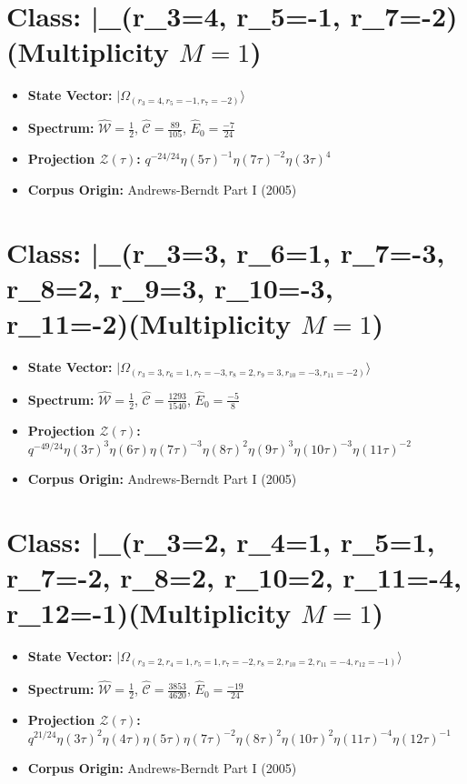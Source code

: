 \documentclass[11pt,twoside,openright]{book}
\begin{document}
\section*{Class: |\Omega_{(r_{3}=4, r_{5}=-1, r_{7}=-2)}\rangle (Multiplicity $M=1$)}
\begin{itemize}
  \item \textbf{State Vector:} $|\Omega_{(r_{3}=4, r_{5}=-1, r_{7}=-2)}\rangle$
  \item \textbf{Spectrum:} $\hat{\mathcal{W}} = \frac{1}{2}$, $\hat{\mathcal{C}} = \frac{89}{105}$, $\hat{E}_0 = \frac{-7}{24}$
  \item \textbf{Projection $\mathcal{Z}(\tau)$:} $q^{-24/24} \eta(5\tau)^{-1} \eta(7\tau)^{-2} \eta(3\tau)^{4}$
  \item \textbf{Corpus Origin:} Andrews-Berndt Part I (2005)
\end{itemize}

\section*{Class: |\Omega_{(r_{3}=3, r_{6}=1, r_{7}=-3, r_{8}=2, r_{9}=3, r_{10}=-3, r_{11}=-2)}\rangle (Multiplicity $M=1$)}
\begin{itemize}
  \item \textbf{State Vector:} $|\Omega_{(r_{3}=3, r_{6}=1, r_{7}=-3, r_{8}=2, r_{9}=3, r_{10}=-3, r_{11}=-2)}\rangle$
  \item \textbf{Spectrum:} $\hat{\mathcal{W}} = \frac{1}{2}$, $\hat{\mathcal{C}} = \frac{1293}{1540}$, $\hat{E}_0 = \frac{-5}{8}$
  \item \textbf{Projection $\mathcal{Z}(\tau)$:} $q^{-49/24} \eta(3\tau)^{3} \eta(6\tau) \eta(7\tau)^{-3} \eta(8\tau)^{2} \eta(9\tau)^{3} \eta(10\tau)^{-3} \eta(11\tau)^{-2}$
  \item \textbf{Corpus Origin:} Andrews-Berndt Part I (2005)
\end{itemize}

\section*{Class: |\Omega_{(r_{3}=2, r_{4}=1, r_{5}=1, r_{7}=-2, r_{8}=2, r_{10}=2, r_{11}=-4, r_{12}=-1)}\rangle (Multiplicity $M=1$)}
\begin{itemize}
  \item \textbf{State Vector:} $|\Omega_{(r_{3}=2, r_{4}=1, r_{5}=1, r_{7}=-2, r_{8}=2, r_{10}=2, r_{11}=-4, r_{12}=-1)}\rangle$
  \item \textbf{Spectrum:} $\hat{\mathcal{W}} = \frac{1}{2}$, $\hat{\mathcal{C}} = \frac{3853}{4620}$, $\hat{E}_0 = \frac{-19}{24}$
  \item \textbf{Projection $\mathcal{Z}(\tau)$:} $q^{21/24} \eta(3\tau)^{2} \eta(4\tau) \eta(5\tau) \eta(7\tau)^{-2} \eta(8\tau)^{2} \eta(10\tau)^{2} \eta(11\tau)^{-4} \eta(12\tau)^{-1}$
  \item \textbf{Corpus Origin:} Andrews-Berndt Part I (2005)
\end{itemize}
\end{document}
